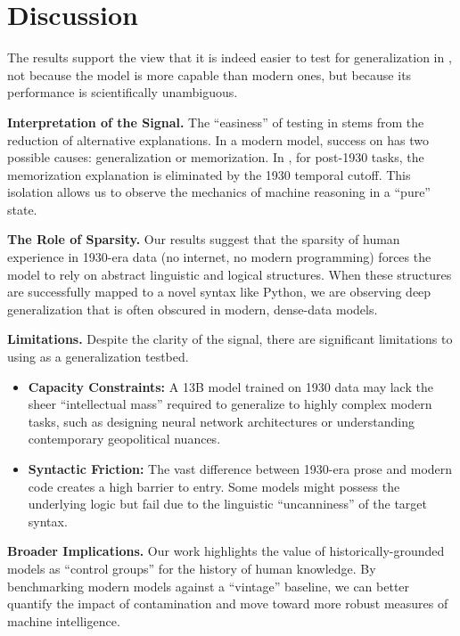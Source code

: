 \section{Discussion}
\label{sec:discussion}

The results support the view that it is indeed easier to test for generalization in \talkie, not because the model is more capable than modern ones, but because its performance is scientifically unambiguous.

{\bf Interpretation of the Signal.} The ``easiness'' of testing in \talkie stems from the reduction of alternative explanations. In a modern model, success on \humaneval has two possible causes: generalization or memorization. In \talkie, for post-1930 tasks, the memorization explanation is eliminated by the 1930 temporal cutoff. This isolation allows us to observe the mechanics of machine reasoning in a ``pure'' state.

{\bf The Role of Sparsity.} Our results suggest that the sparsity of human experience in 1930-era data (no internet, no modern programming) forces the model to rely on abstract linguistic and logical structures. When these structures are successfully mapped to a novel syntax like Python, we are observing deep generalization that is often obscured in modern, dense-data models.

{\bf Limitations.} Despite the clarity of the signal, there are significant limitations to using \talkie as a generalization testbed. 
\begin{itemize}[leftmargin=*,itemsep=0pt,topsep=0pt]
    \item {\bf Capacity Constraints:} A 13B model trained on 1930 data may lack the sheer ``intellectual mass'' required to generalize to highly complex modern tasks, such as designing neural network architectures or understanding contemporary geopolitical nuances.
    \item {\bf Syntactic Friction:} The vast difference between 1930-era prose and modern code creates a high barrier to entry. Some models might possess the underlying logic but fail due to the linguistic ``uncanniness'' of the target syntax.
\end{itemize}

{\bf Broader Implications.} Our work highlights the value of historically-grounded models as ``control groups'' for the history of human knowledge. By benchmarking modern models against a ``vintage'' baseline, we can better quantify the impact of contamination and move toward more robust measures of machine intelligence.
